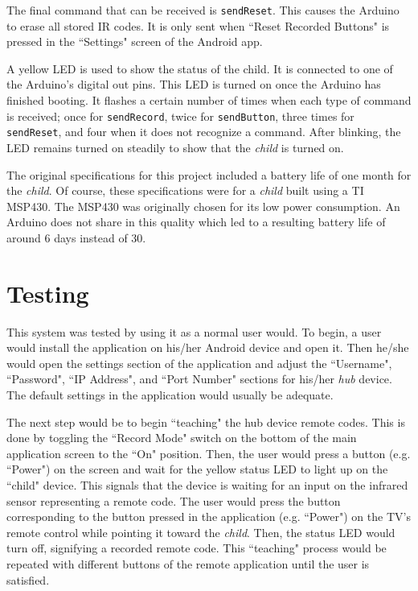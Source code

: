 \documentclass[12pt]{article}
\begin{document}
 The final command that can be received is \texttt{sendReset}. This causes the Arduino to erase all stored IR codes. It is only sent when ``Reset Recorded Buttons" is pressed in the ``Settings" screen of the Android app.   
 
 A yellow LED is used to show the status of the child. It is connected to one of the Arduino's digital out pins. This LED is turned on once the Arduino has finished booting. It flashes a certain number of times when each type of command is received; once for \texttt{sendRecord}, twice for \texttt{sendButton}, three times for \texttt{sendReset}, and four when it does not recognize a command. After blinking, the LED remains turned on steadily to show that the \emph{child} is turned on. 
 
 The original specifications for this project included a battery life of one month for the \emph{child}. Of course, these specifications were for a \emph{child} built using a TI MSP430. The MSP430 was originally chosen for its low power consumption. An Arduino does not share in this quality which led to a resulting battery life of around 6 days instead of 30. 
 
\section*{Testing}
This system was tested by using it as a normal user would. To begin, a user would install the application on his/her Android device and open it. Then he/she would open the settings section of the application and adjust the ``Username", ``Password", ``IP Address", and ``Port Number" sections for his/her \emph{hub} device. The default settings in the application would usually be adequate. 

The next step would be to begin ``teaching" the hub device remote codes. This is done by toggling the ``Record Mode" switch on the bottom of the main application screen to the ``On" position. Then, the user would press a button (e.g. ``Power") on the screen and wait for the yellow status LED to light up on the ``child" device. This signals that the device is waiting for an input on the infrared sensor representing a remote code. The user would press the button corresponding to the button pressed in the application (e.g. ``Power") on the TV's remote control while pointing it toward the \emph{child}. Then, the status LED would turn off, signifying a recorded remote code. This ``teaching" process would be repeated with different buttons of the remote application until the user is satisfied. 
\end{document}
